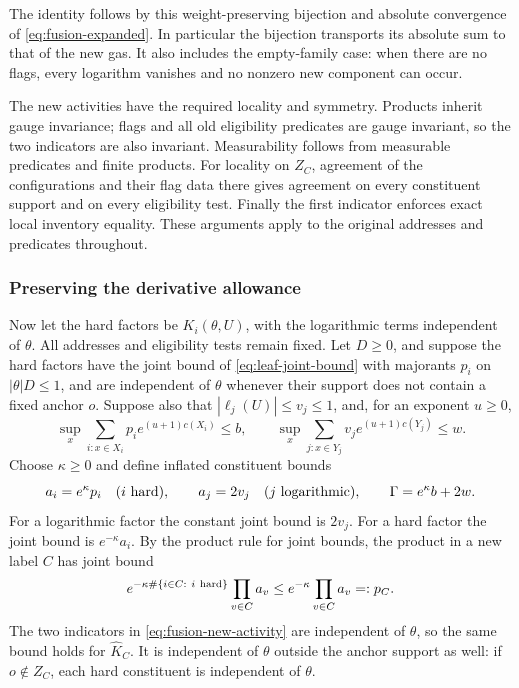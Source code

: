 The identity follows by this weight-preserving bijection and absolute
convergence of \eqref{eq:fusion-expanded}. In particular the bijection
transports its absolute sum to that of the new gas. It also includes
the empty-family case: when there are no flags, every logarithm
vanishes and no nonzero new component can occur.

The new activities have the required locality and symmetry. Products
inherit gauge invariance; flags and all old eligibility predicates
are gauge invariant, so the two indicators are also invariant.
Measurability follows from measurable predicates and finite products.
For locality on $Z_C$, agreement of the configurations and their
flag data there gives agreement on every constituent support and
on every eligibility test. Finally the first indicator enforces
exact local inventory equality. These arguments apply to the
original addresses and predicates throughout.

\subsubsection{Preserving the derivative allowance}
Now let the hard factors be $K_i(\theta,U)$, with the logarithmic
terms independent of $\theta$. All addresses and eligibility tests
remain fixed. Let $D\ge0$, and suppose the hard factors have the
joint bound of \eqref{eq:leaf-joint-bound} with majorants $p_i$ on
$|\theta|D\le1$, and are independent of $\theta$ whenever their
support does not contain a fixed anchor $o$. Suppose also that
$|\ell_j(U)|\le v_j\le1$, and, for an exponent $u\ge0$,
\begin{equation}\label{eq:fusion-site-inputs}
 \sup_x\sum_{i:x\in X_i}p_i e^{(u+1)c(X_i)}\le b,
 \qquad
 \sup_x\sum_{j:x\in Y_j}v_j e^{(u+1)c(Y_j)}\le w.
\end{equation}
Choose $\kappa\ge0$ and define inflated constituent bounds
\[
          a_i=e^\kappa p_i\quad(i\ {\rm hard}),\qquad
          a_j=2v_j\quad(j\ {\rm logarithmic}),\qquad
                              \Gamma=e^\kappa b+2w.
\]
For a logarithmic factor the constant joint bound is $2v_j$.
For a hard factor the joint bound is $e^{-\kappa}a_i$.
By the product rule for joint bounds, the product in a new label $C$
has joint bound
\[
 e^{-\kappa\#\{i\in C:\ i\ {\rm hard}\}}\prod_{v\in C}a_v
                           \le e^{-\kappa}\prod_{v\in C}a_v=:p_C.
\]
The two indicators in \eqref{eq:fusion-new-activity} are independent
of $\theta$, so the same bound holds for $\widehat K_C$.
It is independent of $\theta$ outside the anchor support as well:
if $o\notin Z_C$, each hard constituent is independent of $\theta$.

